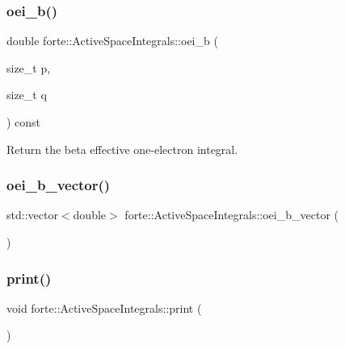 \subsubsection{\texorpdfstring{oei\+\_\+b()}{oei\_b()}}
{\footnotesize\ttfamily double forte\+::\+Active\+Space\+Integrals\+::oei\+\_\+b (\begin{DoxyParamCaption}\item[{size\+\_\+t}]{p,  }\item[{size\+\_\+t}]{q }\end{DoxyParamCaption}) const\hspace{0.3cm}{\ttfamily [inline]}}



Return the beta effective one-\/electron integral. 

\mbox{\label{classforte_1_1_active_space_integrals_abf4ac6d3c017c227daa37406e947bbe5}} 
\subsubsection{\texorpdfstring{oei\+\_\+b\+\_\+vector()}{oei\_b\_vector()}}
{\footnotesize\ttfamily std\+::vector$<$double$>$ forte\+::\+Active\+Space\+Integrals\+::oei\+\_\+b\+\_\+vector (\begin{DoxyParamCaption}{ }\end{DoxyParamCaption})\hspace{0.3cm}{\ttfamily [inline]}}

\mbox{\label{classforte_1_1_active_space_integrals_af93d7e92f4874dacbdd992810bad04c4}} 
\subsubsection{\texorpdfstring{print()}{print()}}
{\footnotesize\ttfamily void forte\+::\+Active\+Space\+Integrals\+::print (\begin{DoxyParamCaption}{ }\end{DoxyParamCaption})}



